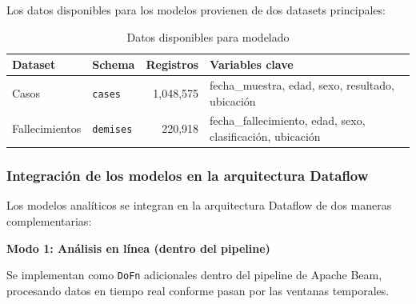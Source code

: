 \documentclass[12pt,a4paper]{article}
\begin{document}
Los datos disponibles para los modelos provienen de dos datasets principales:

\begin{table}[H]
    \centering
    \caption{Datos disponibles para modelado}
    \begin{tabular}{@{}llrl@{}}
        \toprule
        \textbf{Dataset} & \textbf{Schema}  & \textbf{Registros} & \textbf{Variables clave}                                   \\
        \midrule
        Casos            & \texttt{cases}   & 1,048,575          & fecha\_muestra, edad, sexo, resultado, ubicación           \\
        Fallecimientos   & \texttt{demises} & 220,918            & fecha\_fallecimiento, edad, sexo, clasificación, ubicación \\
        \bottomrule
    \end{tabular}
\end{table}

\subsubsection{Integración de los modelos en la arquitectura Dataflow}

Los modelos analíticos se integran en la arquitectura Dataflow de dos maneras complementarias:

\textbf{Modo 1: Análisis en línea (dentro del pipeline)}

Se implementan como \texttt{DoFn} adicionales dentro del pipeline de Apache Beam, procesando datos en tiempo real conforme pasan por las ventanas temporales.
\end{document}
